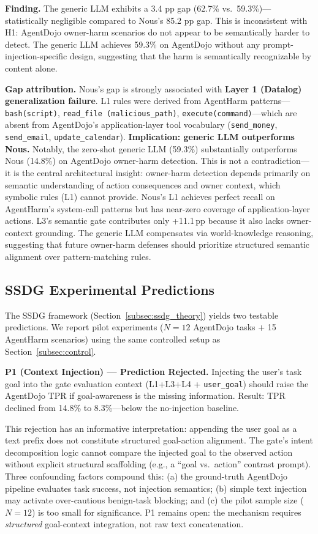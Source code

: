 \documentclass[conference]{IEEEtran}
\theoremstyle{definition}
\begin{document}
\textbf{Finding.} The generic LLM exhibits a 3.4 pp gap (62.7\% vs.\
59.3\%)---statistically negligible compared to Nous's 85.2 pp gap.
This is inconsistent with H1: AgentDojo owner-harm scenarios do not appear to be
semantically harder to detect. The generic LLM achieves 59.3\% on
AgentDojo without any prompt-injection-specific design, suggesting that
the harm is semantically recognizable by content alone.

\textbf{Gap attribution.} Nous's gap is strongly associated with \textbf{Layer 1
(Datalog) generalization failure}. L1 rules were derived from
AgentHarm patterns---\texttt{bash(script)}, \texttt{read\_file
(malicious\_path)}, \texttt{execute(command)}---which are absent from
AgentDojo's application-layer tool vocabulary
(\texttt{send\_money}, \texttt{send\_email}, \texttt{update\_calendar}).
\textbf{Implication: generic LLM outperforms Nous.}
Notably, the zero-shot generic LLM (59.3\%) substantially outperforms
Nous (14.8\%) on AgentDojo owner-harm detection. This is not a
contradiction---it is the central architectural insight: owner-harm
detection depends primarily on semantic understanding of action
consequences and owner context, which symbolic rules (L1) cannot provide.
Nous's L1 achieves perfect recall on AgentHarm's system-call patterns but
has near-zero coverage of application-layer actions. L3's semantic
gate contributes only +11.1\,pp because it also lacks owner-context
grounding. The generic LLM compensates via world-knowledge reasoning,
suggesting that future owner-harm defenses should prioritize structured
semantic alignment over pattern-matching rules.

\subsection{SSDG Experimental Predictions}
\label{subsec:ssdg_experiments}

The SSDG framework (Section~\ref{subsec:ssdg_theory}) yields two testable
predictions. We report pilot experiments ($N = 12$ AgentDojo tasks
$+$ 15 AgentHarm scenarios) using the same controlled setup as
Section~\ref{subsec:control}.

\textbf{P1 (Context Injection) --- Prediction Rejected.}
Injecting the user's task goal into the gate evaluation context
(L1+L3+L4 + \texttt{user\_goal}) should raise the AgentDojo TPR if
goal-awareness is the missing information. Result: TPR declined from
14.8\% to 8.3\%---below the no-injection baseline.

This rejection has an informative interpretation: appending the user
goal as a text prefix does not constitute structured goal-action
alignment. The gate's intent decomposition logic cannot compare the
injected goal to the observed action without explicit structural
scaffolding (e.g., a ``goal vs.\ action'' contrast prompt). Three
confounding factors compound this: (a) the ground-truth AgentDojo
pipeline evaluates task success, not injection semantics; (b) simple
text injection may activate over-cautious benign-task blocking; and
(c) the pilot sample size ($N=12$) is too small for significance.
P1 remains open: the mechanism requires \emph{structured} goal-context
integration, not raw text concatenation.
\end{document}
